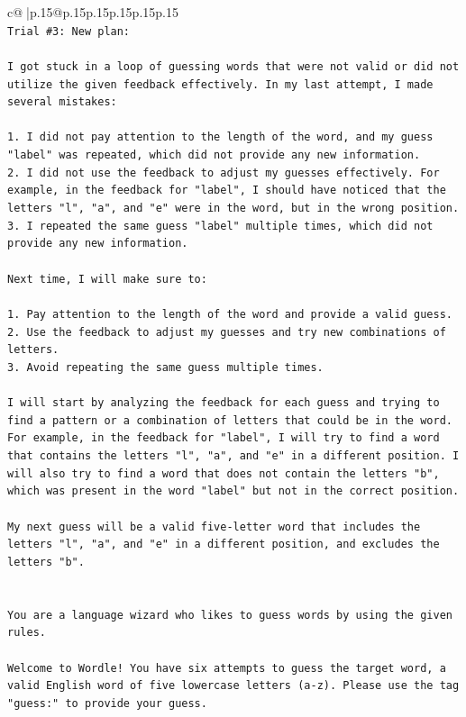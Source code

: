 \documentclass{article}
\begin{document}
{\begin{supertabular}{c@{$\;$}|p{.15\linewidth}@{}p{.15\linewidth}p{.15\linewidth}p{.15\linewidth}p{.15\linewidth}p{.15\linewidth}}
{{{\\ 
\texttt{Trial \#3: New plan: } \\
\\ 
\texttt{I got stuck in a loop of guessing words that were not valid or did not utilize the given feedback effectively. In my last attempt, I made several mistakes: } \\
\\ 
\texttt{1. I did not pay attention to the length of the word, and my guess "label" was repeated, which did not provide any new information. } \\
\texttt{2. I did not use the feedback to adjust my guesses effectively. For example, in the feedback for "label", I should have noticed that the letters "l", "a", and "e" were in the word, but in the wrong position. } \\
\texttt{3. I repeated the same guess "label" multiple times, which did not provide any new information.} \\
\\ 
\texttt{Next time, I will make sure to:} \\
\\ 
\texttt{1. Pay attention to the length of the word and provide a valid guess.} \\
\texttt{2. Use the feedback to adjust my guesses and try new combinations of letters.} \\
\texttt{3. Avoid repeating the same guess multiple times.} \\
\\ 
\texttt{I will start by analyzing the feedback for each guess and trying to find a pattern or a combination of letters that could be in the word. For example, in the feedback for "label", I will try to find a word that contains the letters "l", "a", and "e" in a different position. I will also try to find a word that does not contain the letters "b", which was present in the word "label" but not in the correct position. } \\
\\ 
\texttt{My next guess will be a valid five{-}letter word that includes the letters "l", "a", and "e" in a different position, and excludes the letters "b".} \\
\\ 
\\ 
\texttt{You are a language wizard who likes to guess words by using the given rules.} \\
\\ 
\texttt{Welcome to Wordle! You have six attempts to guess the target word, a valid English word of five lowercase letters (a{-}z). Please use the tag "guess:" to provide your guess.} \\
}}}
\end{supertabular}}
\end{document}
